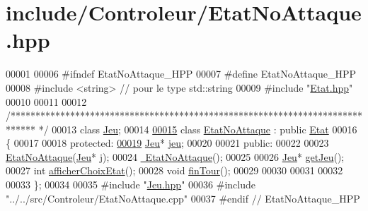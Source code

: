 \hypertarget{_etat_no_attaque_8hpp_source}{\section{include/\-Controleur/\-Etat\-No\-Attaque.hpp}
}

\begin{DoxyCode}
00001 
00006 \textcolor{preprocessor}{#ifndef EtatNoAttaque\_HPP}
00007 \textcolor{preprocessor}{}\textcolor{preprocessor}{#define EtatNoAttaque\_HPP}
00008 \textcolor{preprocessor}{}\textcolor{preprocessor}{#include <string>} \textcolor{comment}{// pour le type std::string}
00009 \textcolor{preprocessor}{#include "\hyperlink{_etat_8hpp}{Etat.hpp}"}
00010 
00011 
00012 \textcolor{comment}{/*****************************************************************************
      */}
00013 \textcolor{keyword}{class }\hyperlink{class_jeu}{Jeu};
00014 
\hypertarget{_etat_no_attaque_8hpp_source_l00015}{}\hyperlink{class_etat_no_attaque}{00015} \textcolor{keyword}{class }\hyperlink{class_etat_no_attaque}{EtatNoAttaque} : \textcolor{keyword}{public} \hyperlink{class_etat}{Etat}
00016 \{
00017 
00018     \textcolor{keyword}{protected}:
\hypertarget{_etat_no_attaque_8hpp_source_l00019}{}\hyperlink{class_etat_no_attaque_ad5dbee65b31bd41e28a648ac22bbbfce}{00019}         \hyperlink{class_jeu}{Jeu}* \hyperlink{class_etat_no_attaque_ad5dbee65b31bd41e28a648ac22bbbfce}{jeu};   
00020 
00021     \textcolor{keyword}{public}:
00022         
00023         \hyperlink{class_etat_no_attaque_a39b37880a28e5cbda92e584221b9a68d}{EtatNoAttaque}(\hyperlink{class_jeu}{Jeu}* j);
00024         \hyperlink{class_etat_no_attaque_a81a0114551961e5780e7e3866f22c6fb}{~EtatNoAttaque}();
00025 
00026         \hyperlink{class_jeu}{Jeu}* \hyperlink{class_etat_no_attaque_ab98d57f8da5876194e0c1496f137c613}{getJeu}();
00027         \textcolor{keywordtype}{int} \hyperlink{class_etat_no_attaque_ac89ab0d1f4483c7623617299b08922e3}{afficherChoixEtat}();
00028         \textcolor{keywordtype}{void} \hyperlink{class_etat_no_attaque_aea58b2b3580f3adbd93a4fa69398b51e}{finTour}();
00029         
00030         
00031         
00032         
00033 \};
00034 
00035 \textcolor{preprocessor}{#include "\hyperlink{_jeu_8hpp}{Jeu.hpp}"}
00036 \textcolor{preprocessor}{#include "../../src/Controleur/EtatNoAttaque.cpp"}
00037 \textcolor{preprocessor}{#endif // EtatNoAttaque\_HPP     }
\end{DoxyCode}
